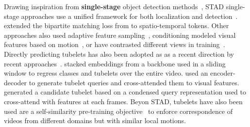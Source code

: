 \documentclass[smallextended,twocolumn,natbib]{svjour3}
\begin{document}
Drawing inspiration from \textbf{single-stage} object detection methods~\citep{carion2020end,redmon2016you,liu2016ssd}, STAD single-stage approaches use a unified framework for both localization and detection~\citep{chen2021watch,girdhar2019video,zhu2024dual}. \citet{ntinou2024multiscale} extended the bipartite matching loss from \citet{carion2020end} to spatio-temporal tokens. Other approaches also used adaptive feature sampling~\citep{wu2023stmixer}, conditioning modeled visual features based on motion~\citep{zhao2019dance}, or have contrasted different views in training~\citep{kumar2022end}. Directly predicting tubelets has also been adopted as as a recent direction by recent approaches~\citep{gritsenko2024end,kalogeiton2017action,song2019tacnet,yang2019step,zhao2022tuber}. \citet{kalogeiton2017action} stacked embeddings from a backbone used in a sliding window to regress classes and tubelets over the entire video. \citet{zhao2022tuber} used an encoder-decoder to generate tubelet queries and cross-attended them to visual features. \citet{gritsenko2024end} generated a candidate tubelet based on a condensed query representation used to cross-attend with features at each frames. Beyon STAD, tubelets have also been used are a self-similarity pre-training objective~\citep{thoker2023tubelet} to enforce correspondence of videos from different domains but with similar local motions. 
\end{document}
